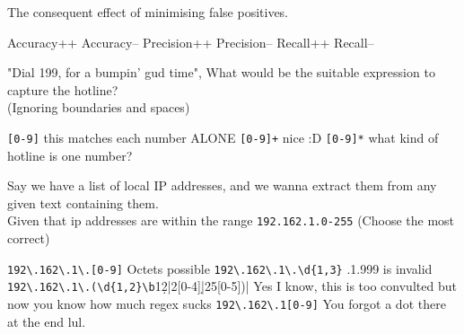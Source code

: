 \documentclass[theme=sleek, randomorder, hidesidemenu]{webquiz}
\begin{document}
\begin{question}

  The consequent effect of minimising false positives.

  \begin{choice}[multiple, columns=3]
    \correct Accuracy++
    \incorrect Accuracy--
    \correct Precision++
    \incorrect Precision--
    \incorrect Recall++
    \incorrect Recall--
  \end{choice}

\end{question}

\begin{question}

  "Dial 199, for a bumpin' gud time", What would be the suitable expression to capture the hotline?\\
  (Ignoring boundaries and spaces)

  \begin{choice}
    \incorrect \verb|[0-9]| \feedback this matches each number ALONE
    \correct \verb|[0-9]+| \feedback nice :D
    \incorrect \verb|[0-9]*| \feedback what kind of hotline is one number?

  \end{choice}
\end{question}

\begin{question}

  Say we have a list of local IP addresses, and we wanna extract them from any given text containing them.\\
  Given that ip addresses are within the range \verb|192.162.1.0-255|
  (Choose the most correct)

  \begin{choice}[columns=2]
    \incorrect \verb|192\.162\.1\.[0-9]|  Octets possible
    \incorrect \verb|192\.162\.1\.\d{1,3}| .1.999 is invalid
    \correct \verb|192\.162\.1\.(\d{1,2}\b|1\d{2}|2[0-4]\d|25[0-5])|
    \feedback Yes I know, this is too convulted but now you know how much regex sucks
    \incorrect \verb|192\.162\.1[0-9]| \feedback You forgot a dot there at the end lul.
  \end{choice}

\end{question}
\end{document}
